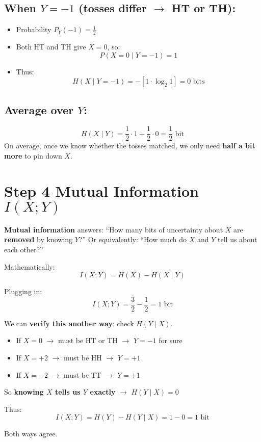 \documentclass[11pt]{article}
\begin{document}
\subsection*{When $Y = -1$ (tosses differ $\to$ HT or TH):}
\begin{itemize}
    \item Probability $P_Y(-1) = \frac{1}{2}$
    \item Both HT and TH give $X = 0$, so:
    \[
    P(X = 0 \mid Y = -1) = 1
    \]
    \item Thus:
    \[
    H(X \mid Y = -1) = -[1 \cdot \log_2 1] = 0 \text{ bits}
    \]
\end{itemize}

\subsection*{Average over $Y$:}
\[
H(X \mid Y) = \frac{1}{2} \cdot 1 + \frac{1}{2} \cdot 0 = \frac{1}{2} \text{ bit}
\]
On average, once we know whether the tosses matched, we only need \textbf{half a bit more} to pin down $X$.

\section*{{Step 4} Mutual Information $I(X; Y)$}

\textbf{Mutual information} answers:  
``How many bits of uncertainty about $X$ are \textbf{removed} by knowing $Y$?''  
Or equivalently: ``How much do $X$ and $Y$ tell us about each other?''

Mathematically:
\[
I(X; Y) = H(X) - H(X \mid Y)
\]

Plugging in:
\[
I(X; Y) = \frac{3}{2} - \frac{1}{2} = 1 \text{ bit}
\]

We can \textbf{verify this another way}: check $H(Y \mid X)$.

\begin{itemize}
    \item If $X = 0$ $\to$ must be HT or TH $\to$ $Y = -1$ for sure
    \item If $X = +2$ $\to$ must be HH $\to$ $Y = +1$
    \item If $X = -2$ $\to$ must be TT $\to$ $Y = +1$
\end{itemize}
So \textbf{knowing $X$ tells us $Y$ exactly} $\to$ $H(Y \mid X) = 0$

Thus:
\[
I(X; Y) = H(Y) - H(Y \mid X) = 1 - 0 = 1 \text{ bit}
\]

Both ways agree.
\end{document}
